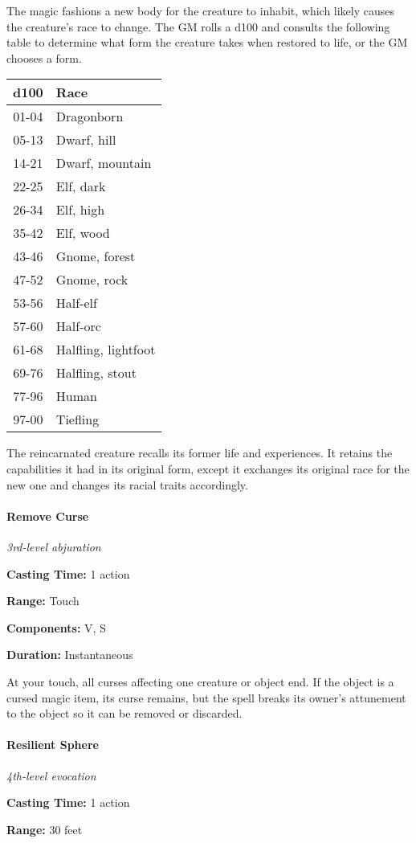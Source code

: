 \documentclass[
]{article}
\begin{document}
The magic fashions a new body for the creature to inhabit, which likely
causes the creature's race to change. The GM rolls a d100 and consults
the following table to determine what form the creature takes when
restored to life, or the GM chooses a form.

\begin{longtable}[]{@{}cl@{}}
\toprule
d100 & Race\tabularnewline
\midrule
\endhead
01-04 & Dragonborn\tabularnewline
05-13 & Dwarf, hill\tabularnewline
14-21 & Dwarf, mountain\tabularnewline
22-25 & Elf, dark\tabularnewline
26-34 & Elf, high\tabularnewline
35-42 & Elf, wood\tabularnewline
43-46 & Gnome, forest\tabularnewline
47-52 & Gnome, rock\tabularnewline
53-56 & Half-elf\tabularnewline
57-60 & Half-orc\tabularnewline
61-68 & Halfling, lightfoot\tabularnewline
69-76 & Halfling, stout\tabularnewline
77-96 & Human\tabularnewline
97-00 & Tiefling\tabularnewline
\bottomrule
\end{longtable}

The reincarnated creature recalls its former life and experiences. It
retains the capabilities it had in its original form, except it
exchanges its original race for the new one and changes its racial
traits accordingly.

\hypertarget{remove-curse}{%
\paragraph{Remove Curse}\label{remove-curse}}

\emph{3rd-level abjuration}

\textbf{Casting Time:} 1 action

\textbf{Range:} Touch

\textbf{Components:} V, S

\textbf{Duration:} Instantaneous

At your touch, all curses affecting one creature or object end. If the
object is a cursed magic item, its curse remains, but the spell breaks
its owner's attunement to the object so it can be removed or discarded.

\hypertarget{resilient-sphere}{%
\paragraph{Resilient Sphere}\label{resilient-sphere}}

\emph{4th-level evocation}

\textbf{Casting Time:} 1 action

\textbf{Range:} 30 feet
\end{document}
